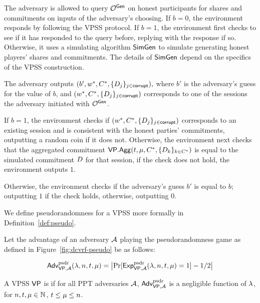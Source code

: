 The adversary is allowed to query $\mathcal{O}^{\mathsf{Gen}}$ on honest participants for shares and commitments on inputs of the adversary's choosing.
If $b=0$,
the environment responds by following the VPSS protocol.
If $b=1$,
the environment first checks to see if it has responded to the query before,
replying with the response if so.
Otherwise, it uses a simulating algorithm $\mathsf{SimGen}$ to simulate generating honest players' shares and commitments.
The details of $\mathsf{SimGen}$ depend on the specifics of the VPSS construction.

The adversary outputs $(b', w^*, C^*, \{ D_j \}_{j \in \mathsf{corrupt}}),$
where $b'$ is the adversary's guess for the value of $b$,
and $(w^*, C^*, \{ D_j \}_{j \in \mathsf{corrupt}})$ corresponds to one of the sessions the adversary initiated with $\mathcal{O}^{\mathsf{Gen}}$.

If $b=1$,
the environment checks if $(w^*, C^*, \{ D_j \}_{j \in \mathsf{corrupt}})$ corresponds to an  existing session and is consistent with the honest parties' commitments,
outputting a random coin if it does not.
Otherwise, the environment next checks that the aggregated commitment $\mathsf{VP}.\mathsf{Agg}(t, \mu, C^*, \{ D_k \}_{k \in C^*})$ is equal to the simulated commitment $D$ for that session,
if the check does not hold,
the environment outputs $1$.

Otherwise, the environment checks if the adversary's guess $b'$ is equal to $b$;
outputting $1$ if the check holds,
otherwise, outputting $0$.

We define pseudorandomness for a VPSS more formally in Definition~\ref{def:pseudo}.

\begin{definition} \label{def:pseudo}
Let the advantage of an adversary $\mathcal{A}$ playing the pseudorandomness game as
defined in Figure~\ref{fig:dcvrf-pseudo} be as follows:

\[
  \textsf{\upshape Adv}^{\textrm{\upshape psdr}}_{\mathsf{VP},\mathcal{A}}(\lambda, n, t, \mu)
  = \bigl| \Pr[ \textsf{\upshape Exp}^{\textrm{\upshape psdr}}_{\mathsf{VP},\mathcal{A}}(\lambda, n, t, \mu) = 1]  - 1/2 \bigr|
\]

  A VPSS $\mathsf{VP}$ is  if for all PPT adversaries $\mathcal{A}$,
  $\textsf{\upshape Adv}^{\textrm{\upshape psdr}}_{\mathsf{VP},\mathcal{A}}$ is a negligible function of $\lambda$,
  for $n, t, \mu \in \mathbb{N}$,
  $t \leq \mu \leq n$.
\end{definition}


